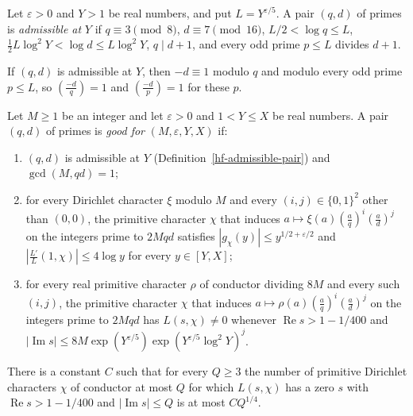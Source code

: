 \begin{definition}\label{hf-admissible-pair}
Let $\varepsilon>0$ and $Y>1$ be real numbers, and put $L=Y^{\varepsilon/5}$. A pair $(q,d)$ of
primes is \emph{admissible at} $Y$ if $q\equiv3\pmod8$, $d\equiv7\pmod{16}$,
$L/2<\log q\leq L$, $\tfrac12L\log^2Y<\log d\leq L\log^2Y$, $q\mid d+1$, and every odd prime
$p\leq L$ divides $d+1$.

If $(q,d)$ is admissible at $Y$, then $-d\equiv1$ modulo $q$ and modulo every odd prime $p\leq L$,
so $\left(\frac{-d}{q}\right)=1$ and $\left(\frac{-d}{p}\right)=1$ for these $p$.
\end{definition}

\begin{definition}\label{hf-good-pair}
Let $M\geq1$ be an integer and let $\varepsilon>0$ and $1<Y\leq X$ be real numbers. A pair $(q,d)$
of primes is \emph{good for} $(M,\varepsilon,Y,X)$ if:
\begin{enumerate}
\item $(q,d)$ is admissible at $Y$ (Definition~\ref{hf-admissible-pair}) and $\gcd(M,qd)=1$;
\item for every Dirichlet character $\xi$ modulo $M$ and every $(i,j)\in\{0,1\}^2$ other than
  $(0,0)$, the primitive character $\chi$ that induces
  $a\mapsto\xi(a)\left(\frac aq\right)^i\left(\frac ad\right)^j$ on the integers prime to $2Mqd$
  satisfies $|g_\chi(y)|\leq y^{1/2+\varepsilon/2}$ and
  $\left|\frac{L'}{L}(1,\chi)\right|\leq4\log y$ for every $y\in[Y,X]$;
\item for every real primitive character $\rho$ of conductor dividing $8M$ and every such $(i,j)$,
  the primitive character $\chi$ that induces
  $a\mapsto\rho(a)\left(\frac aq\right)^i\left(\frac ad\right)^j$ on the integers prime to $2Mqd$
  has $L(s,\chi)\neq0$ whenever $\operatorname{Re}s>1-1/400$ and
  $|\operatorname{Im}s|\leq8M\exp(Y^{\varepsilon/5})\exp(Y^{\varepsilon/5}\log^2Y)^{j}$.
\end{enumerate}
\end{definition}

\begin{theorem}\label{hf-zero-density-box}
There is a constant $C$ such that for every $Q\geq3$ the number of primitive Dirichlet characters
$\chi$ of conductor at most $Q$ for which $L(s,\chi)$ has a zero $s$ with
$\operatorname{Re}s>1-1/400$ and $|\operatorname{Im}s|\leq Q$ is at most $CQ^{1/4}$.
\end{theorem}


